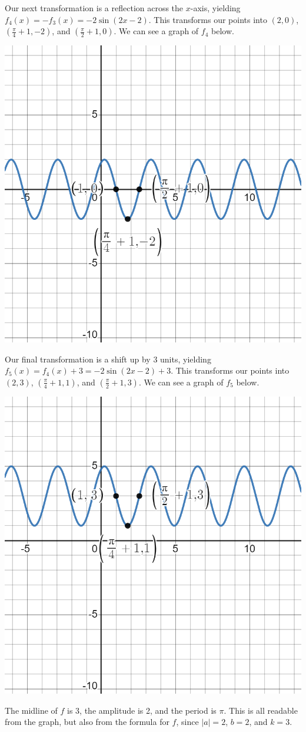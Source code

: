 \documentclass{ximera}
\begin{document}
\begin{example}
\begin{explanation}
Our next transformation is a reflection across the $x$-axis, yielding $f_4(x) = -f_3(x) = -2\sin(2x - 2)$. This transforms our points into $(2, 0)$, $\left(\frac{\pi}{4} + 1, -2 \right)$, and $\left(\frac{\pi}{2} + 1, 0\right)$.  We can see a graph of $f_4$ below.
\begin{image}
\includegraphics[width=0.8\linewidth]{images/graph-2-ex4.png}
\end{image}

Our final transformation is a shift up by 3 units, yielding $f_5(x) = f_4(x) + 3 = -2\sin(2x - 2) + 3$. This transforms our points into $(2, 3)$, $\left(\frac{\pi}{4} + 1, 1 \right)$, and $\left(\frac{\pi}{2} + 1, 3\right)$.  We can see a graph of $f_5$ below.
\begin{image}
\includegraphics[width=0.8\linewidth]{images/graph-2-ex5.png}
\end{image}

The midline of $f$ is 3, the amplitude is 2, and the period is $\pi$. This is all readable from the graph, but also from the formula for $f$, since $|a| = 2$, $b = 2$, and $k = 3$. 
\end{explanation}
\end{example}
\end{document}
